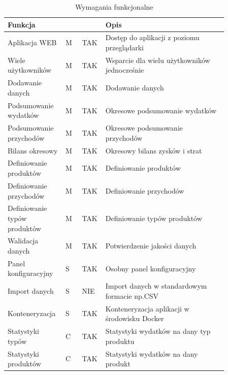 \documentclass[a4paper,10pt, twoside]{report}
\newcommand{\customstyletable}[1]{\footnotesize{\textbf{#1}}}
\newcommand{\customstyletablecentered}[1]{\footnotesize\centering{\textbf{#1}}}
\begin{document}
\begin{large}
\begin{table}[H] %
    \caption{Wymagania funkcjonalne}
    \label{Wymagania funkcjonalne}
    \footnotesize
    \begin{tabular}{|p{0.2\linewidth}|p{0.07\linewidth}|p{0.07\linewidth}|p{0.52\linewidth}|}  %
    \hline                  %
    \customstyletable{Funkcja} & \customstyletablecentered{PRIO} & \customstyletablecentered{IMPL}& \customstyletable{Opis} \\
    \hline
    {Aplikacja WEB} & {M} & {TAK} & {Dostęp do aplikacji z poziomu przeglądarki}\\
    \hline
    {Wiele użytkowników} & {M} & {TAK} & {Wsparcie dla wielu użytkowników jednocześnie}\\
    \hline
    {Dodawanie danych} & {M} & {TAK} & {Dodawanie danych}\\
    \hline
    {Podsumowanie wydatków} & {M} & {TAK} & {Okresowe podsumowanie wydatków}\\
    \hline
    {Podsumowanie przychodów} & {M} & {TAK} & {Okresowe podsumowanie przychodów}\\
    \hline
    {Bilans okresowy} & {M} & {TAK} & {Okresowy bilans zysków i strat}\\
    \hline
    {Definiowanie produktów} & {M} & {TAK} & {Definiowanie produktów}\\
    \hline
    {Definiowanie przychodów} & {M} & {TAK} & {Definiowanie przychodów}\\
    \hline
    {Definiowanie typów produktów} & {M} & {TAK} & {Definiowanie typów produktów}\\
    \hline
    {Walidacja danych} & {M} & {TAK} & {Potwierdzenie jakości danych}\\
    \hline
    {Panel konfiguracyjny} & {S} & {TAK} & {Osobny panel konfiguracyjny}\\
    \hline
    {Import danych} & {S} & {NIE} & {Import danych w standardowym formacie np.CSV}\\
    \hline
    {Konteneryzacja} & {S} & {TAK} & {Konteneryzacja aplikacji w środowisku Docker}\\
    \hline
    {Statystyki typów} & {C} & {TAK} & {Statystyki wydatków na dany typ produktu}\\
    \hline
    {Statystyki produktów} & {C} & {TAK} & {Statystyki wydatków na dany produkt}\\

\end{tabular}
\end{table}
\end{large}
\end{document}
